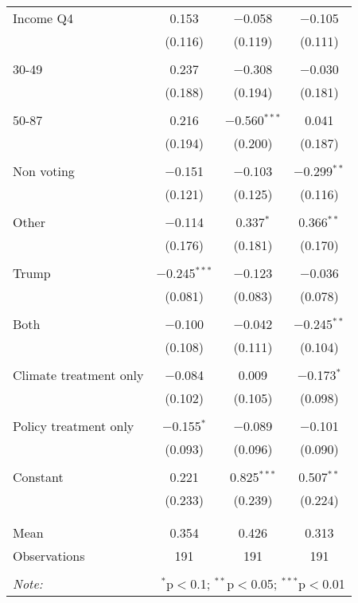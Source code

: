 \begin{tabular}{@{\extracolsep{5pt}}lccc}
 Income Q4 & 0.153 & $-$0.058 & $-$0.105 \\ 
  & (0.116) & (0.119) & (0.111) \\ 
  & & & \\ 
 30-49 & 0.237 & $-$0.308 & $-$0.030 \\ 
  & (0.188) & (0.194) & (0.181) \\ 
  & & & \\ 
 50-87 & 0.216 & $-$0.560$^{***}$ & 0.041 \\ 
  & (0.194) & (0.200) & (0.187) \\ 
  & & & \\ 
 Non voting & $-$0.151 & $-$0.103 & $-$0.299$^{**}$ \\ 
  & (0.121) & (0.125) & (0.116) \\ 
  & & & \\ 
 Other & $-$0.114 & 0.337$^{*}$ & 0.366$^{**}$ \\ 
  & (0.176) & (0.181) & (0.170) \\ 
  & & & \\ 
 Trump & $-$0.245$^{***}$ & $-$0.123 & $-$0.036 \\ 
  & (0.081) & (0.083) & (0.078) \\ 
  & & & \\ 
 Both & $-$0.100 & $-$0.042 & $-$0.245$^{**}$ \\ 
  & (0.108) & (0.111) & (0.104) \\ 
  & & & \\ 
 Climate treatment only & $-$0.084 & 0.009 & $-$0.173$^{*}$ \\ 
  & (0.102) & (0.105) & (0.098) \\ 
  & & & \\ 
 Policy treatment only & $-$0.155$^{*}$ & $-$0.089 & $-$0.101 \\ 
  & (0.093) & (0.096) & (0.090) \\ 
  & & & \\ 
 Constant & 0.221 & 0.825$^{***}$ & 0.507$^{**}$ \\ 
  & (0.233) & (0.239) & (0.224) \\ 
  & & & \\ 
\hline \\[-1.8ex] 
Mean & 0.354 & 0.426 & 0.313 \\ 
Observations & 191 & 191 & 191 \\ 
\hline 
\hline \\[-1.8ex] 
\textit{Note:}  & \multicolumn{3}{r}{$^{*}$p$<$0.1; $^{**}$p$<$0.05; $^{***}$p$<$0.01} \\ 
\end{tabular} 
